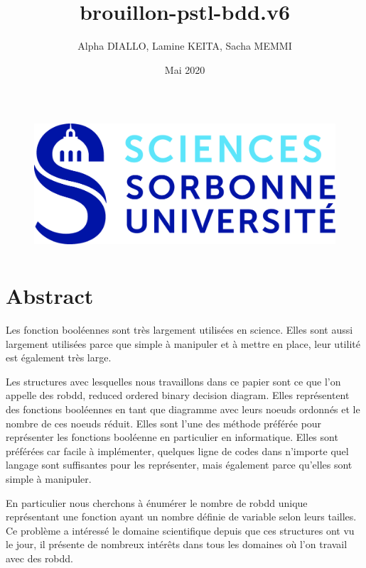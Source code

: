 \documentclass[french]{article}
\title{brouillon-pstl-bdd.v6}
\author{Alpha DIALLO, Lamine KEITA, Sacha MEMMI}
\date{Mai 2020}
\begin{document}
\maketitle
\begin{figure}[htp]
    \centering
    \includegraphics[width=12cm, height=5cm]{logo_upmc}
    \label{fig:logo}
\end{figure}


\newpage
\tableofcontents
\newpage
\section{Abstract}


Les fonction booléennes sont très largement utilisées en science. Elles sont aussi largement utilisées parce que simple à manipuler et à mettre en place, leur utilité est également très large. 
\vspace{5mm} %

Les structures avec lesquelles nous travaillons dans ce papier sont ce que l'on appelle des robdd, reduced ordered binary decision diagram. Elles représentent des fonctions booléennes en tant que diagramme avec leurs noeuds ordonnés et le nombre de ces noeuds réduit. Elles sont l'une des méthode préférée pour représenter les fonctions booléenne en particulier en informatique. Elles sont préférées car facile à implémenter, quelques ligne de codes dans n'importe quel langage sont suffisantes pour les représenter, mais également parce qu'elles sont simple à manipuler.
\vspace{5mm} %

En particulier nous cherchons à énumérer le nombre de robdd unique représentant une fonction ayant un nombre définie de variable selon leurs tailles. Ce problème a intéressé le domaine scientifique depuis que ces structures ont vu le jour, il présente de nombreux intérêts dans tous les domaines où l'on travail avec des robdd.
\vspace{5mm} %
\end{document}
